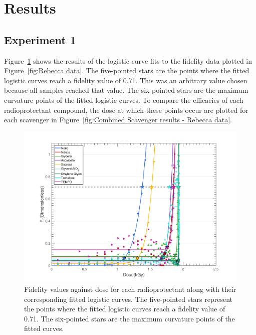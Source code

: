 \section{Results}
\label{sec:Results}

\subsection{Experiment 1}
\label{sub:Experiment 1 - Results}
Figure~\ref{fig:Main radioprotectant plot - Rebecca data} shows the results of the logistic curve fits to the fidelity data plotted in Figure~\ref{fig:Rebecca data}. The five-pointed stars are the points where the fitted logistic curves reach a fidelity value of 0.71. This was an arbitrary value chosen because all samples reached that value. The six-pointed stars are the maximum curvature points of the fitted logistic curves. To compare the efficacies of each radioprotectant compound, the dose at which these points occur are plotted for each scavenger in Figure~\ref{fig:Combined Scavenger results - Rebecca data}.

\begin{figure}
    \centering
    \includegraphics[width=1.0\textwidth]{figures/saxs/ScavengerPlot.pdf}
    \caption{Fidelity values against dose for each radioprotectant along with their corresponding fitted logistic curves. The five-pointed stars represent the points where the fitted logistic curves reach a fidelity value of 0.71. The six-pointed stars are the maximum curvature points of the fitted curves.}
    \label{fig:Main radioprotectant plot - Rebecca data}
\end{figure}

